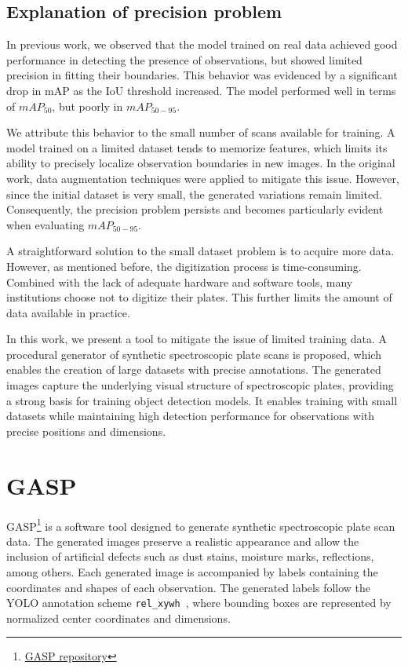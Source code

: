 \documentclass[runningheads]{llncs}
\begin{document}
\subsection{Explanation of precision problem}

In previous work, we observed that the model trained on real data achieved good performance in detecting the presence of observations, but showed limited precision in fitting their boundaries. This behavior was evidenced by a significant drop in mAP as the IoU threshold increased. The model performed well in terms of $mAP_{50}$, but poorly in $mAP_{50-95}$.

We attribute this behavior to the small number of scans available for training. A model trained on a limited dataset tends to memorize features, which limits its ability to precisely localize observation boundaries in new images. In the original work, data augmentation techniques were applied to mitigate this issue. However, since the initial dataset is very small, the generated variations remain limited. Consequently, the precision problem persists and becomes particularly evident when evaluating $mAP_{50-95}$.

A straightforward solution to the small dataset problem is to acquire more data. However, as mentioned before, the digitization process is time-consuming. Combined with the lack of adequate hardware and software tools, many institutions choose not to digitize their plates. This further limits the amount of data available in practice. 

In this work, we present a tool to mitigate the issue of limited training data. A procedural generator of synthetic spectroscopic plate scans is proposed, which enables the creation of large datasets with precise annotations. The generated images capture the underlying visual structure of spectroscopic plates, providing a strong basis for training object detection models. It enables training with small datasets while maintaining high detection performance for observations with precise positions and dimensions.

\section{GASP}

GASP\footnote{\href{https://github.com/Sansanto2000/GASP}{GASP repository}} is a software tool designed to generate synthetic spectroscopic plate scan data. The generated images preserve a realistic appearance and allow the inclusion of artificial defects such as dust stains, moisture marks, reflections, among others. Each generated image is accompanied by labels containing the coordinates and shapes of each observation. The generated labels follow the YOLO annotation scheme \texttt{rel\_xywh}~\cite{redmon2016you}, where bounding boxes are represented by normalized center coordinates and dimensions.
\end{document}
